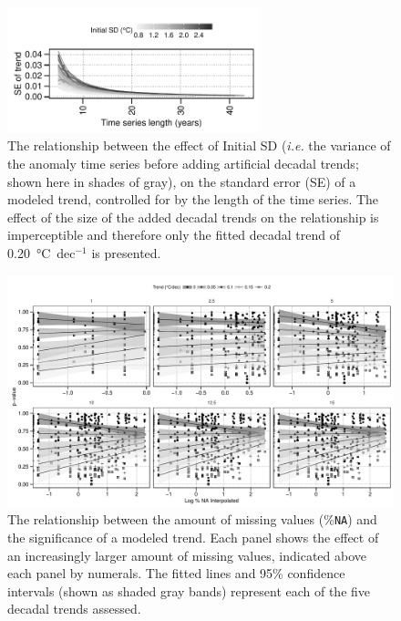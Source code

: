 \documentclass[]{ametsoc}
\begin{document}
\begin{figure}
\centering \includegraphics[width=0.65\textwidth]{figure06}
\caption{The relationship between the effect of Initial SD (\emph{i.e.} the variance of the anomaly time series before adding artificial decadal trends; shown here in shades of gray), on the standard error (SE) of a modeled trend, controlled for by the length of the time series. The effect of the size of the added decadal trends on the relationship is imperceptible and therefore only the fitted decadal trend of \SI{0.20}{\degreeCelsius}~dec$^{-1}$ is presented.}
\label{figure06}
\end{figure}

\begin{figure}
\centering \includegraphics[width=1.0\textwidth]{figure07}
\caption{The relationship between the amount of missing values (\%\texttt{NA}) and the significance of a modeled trend. Each panel shows the effect of an increasingly larger amount of missing values, indicated above each panel by numerals. The fitted lines and 95\% confidence intervals (shown as shaded gray bands) represent each of the five decadal trends assessed.}
\label{figure07}
\end{figure}
\end{document}
